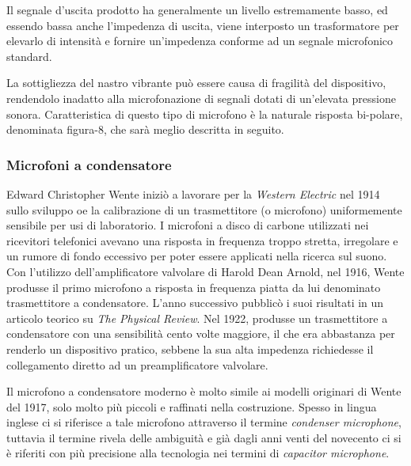 \begin{refsection}
Il segnale d’uscita prodotto ha generalmente un livello estremamente basso,
ed essendo bassa anche l’impedenza di uscita, viene interposto un trasformatore
per elevarlo di intensità e fornire un’impedenza conforme ad un segnale microfonico standard.

La sottigliezza del nastro vibrante può essere causa di fragilità del dispositivo,
rendendolo inadatto alla microfonazione di segnali dotati di un’elevata pressione
sonora. Caratteristica di questo tipo di microfono è la naturale risposta bi-polare,
denominata figura-8, che sarà meglio descritta in seguito.

\subsubsection{Microfoni a condensatore}

Edward Christopher Wente iniziò a lavorare per la \emph{Western Electric} nel 1914
sullo sviluppo oe la calibrazione di un
trasmettitore (o microfono) uniformemente sensibile per usi di laboratorio.
I microfoni a disco di carbone utilizzati nei ricevitori telefonici avevano una
risposta in frequenza troppo stretta, irregolare e un rumore di fondo eccessivo
per poter essere applicati nella ricerca sul suono. Con l'utilizzo
dell'amplificatore valvolare di Harold Dean Arnold, nel 1916, Wente produsse il
primo microfono a risposta in frequenza piatta da lui denominato trasmettitore a
condensatore. L'anno successivo pubblicò i suoi risultati in
un articolo teorico su \emph{The Physical Review}. Nel 1922, produsse un
trasmettitore a condensatore con una sensibilità cento volte maggiore, il che
era abbastanza per renderlo un dispositivo pratico, sebbene la sua alta
impedenza richiedesse il collegamento diretto ad un preamplificatore valvolare.

Il microfono a condensatore moderno è molto simile ai modelli originari di Wente
del 1917, solo molto più piccoli e raffinati nella costruzione. Spesso  in lingua
inglese ci si riferisce a tale microfono attraverso il termine
\emph{condenser microphone}, tuttavia il termine rivela delle ambiguità e già
dagli anni venti del novecento ci si è riferiti con più precisione alla tecnologia nei termini
di \emph{capacitor microphone}.


\end{refsection}
